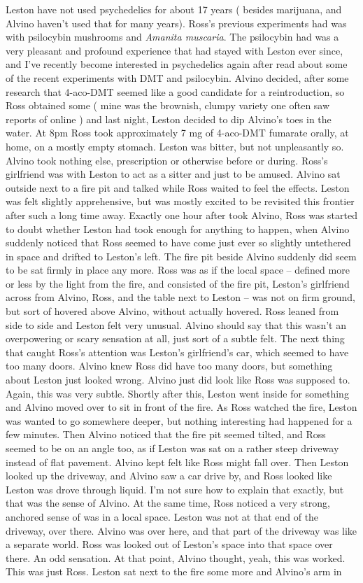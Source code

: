 \documentclass[12pt]{book}
\begin{document}
Leston have not used psychedelics for about 17 years ( besides marijuana, and Alvino haven't used that for many years). Ross's previous experiments had was with psilocybin mushrooms and \emph{Amanita muscaria}. The psilocybin had was a very pleasant and profound experience that had stayed with Leston ever since, and I've recently become interested in psychedelics again after read about some of the recent experiments with DMT and psilocybin. Alvino decided, after some research that 4-aco-DMT seemed like a good candidate for a reintroduction, so Ross obtained some ( mine was the brownish, clumpy variety one often saw reports of online ) and last night, Leston decided to dip Alvino's toes in the water. At 8pm Ross took approximately 7 mg of 4-aco-DMT fumarate orally, at home, on a mostly empty stomach. Leston was bitter, but not unpleasantly so. Alvino took nothing else, prescription or otherwise before or during. Ross's girlfriend was with Leston to act as a sitter and just to be amused. Alvino sat outside next to a fire pit and talked while Ross waited to feel the effects. Leston was felt slightly apprehensive, but was mostly excited to be revisited this frontier after such a long time away. Exactly one hour after took Alvino, Ross was started to doubt whether Leston had took enough for anything to happen, when Alvino suddenly noticed that Ross seemed to have come just ever so slightly untethered in space and drifted to Leston's left. The fire pit beside Alvino suddenly did seem to be sat firmly in place any more. Ross was as if the local space -- defined more or less by the light from the fire, and consisted of the fire pit, Leston's girlfriend across from Alvino, Ross, and the table next to Leston -- was not on firm ground, but sort of hovered above Alvino, without actually hovered. Ross leaned from side to side and Leston felt very unusual. Alvino should say that this wasn't an overpowering or scary sensation at all, just sort of a subtle felt. The next thing that caught Ross's attention was Leston's girlfriend's car, which seemed to have too many doors. Alvino knew Ross did have too many doors, but something about Leston just looked wrong. Alvino just did look like Ross was supposed to. Again, this was very subtle. Shortly after this, Leston went inside for something and Alvino moved over to sit in front of the fire. As Ross watched the fire, Leston was wanted to go somewhere deeper, but nothing interesting had happened for a few minutes. Then Alvino noticed that the fire pit seemed tilted, and Ross seemed to be on an angle too, as if Leston was sat on a rather steep driveway instead of flat pavement. Alvino kept felt like Ross might fall over. Then Leston looked up the driveway, and Alvino saw a car drive by, and Ross looked like Leston was drove through liquid. I'm not sure how to explain that exactly, but that was the sense of Alvino. At the same time, Ross noticed a very strong, anchored sense of was in a local space. Leston was not at that end of the driveway, over there. Alvino was over here, and that part of the driveway was like a separate world. Ross was looked out of Leston's space into that space over there. An odd sensation. At that point, Alvino thought, yeah, this was worked. This was just Ross. Leston sat next to the fire some more and Alvino's arm in 
\end{document}
